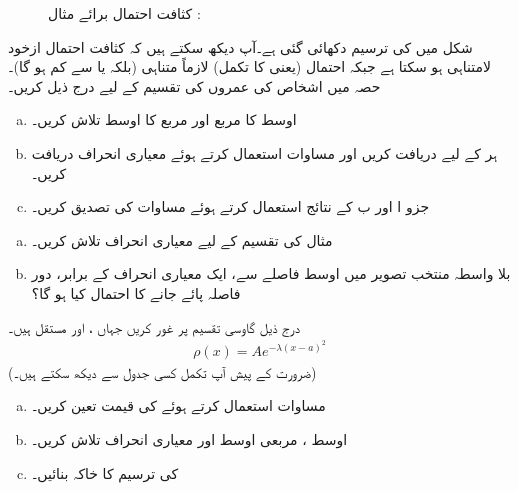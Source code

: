 \begin{figure}
\centering
{}
\caption{کثافت احتمال برائے مثال : }
\label{شکل_تفاعل_موج_کثافت_احتمال_برائے_مثال}
\end{figure}


 شکل    میں    کی ترسیم دکھائی گئی ہے۔آپ دیکھ سکتے ہیں کہ کثافت احتمال ازخود لامتناہی ہو سکتا ہے جبکہ  احتمال (یعنی  کا تکمل) لازماً  متناہی (بلکہ   یا  سے کم ہو گا)۔
 حصہ  میں اشخاص کی عمروں کی تقسیم کے لیے درج ذیل کریں۔ 
\begin{enumerate}[a.]
\item
اوسط کا مربع  اور مربع کا اوسط  تلاش کریں۔ 
\item
 ہر   کے لیے  دریافت کریں اور مساوات  استعمال کرتے ہوئے  معیاری انحراف دریافت کریں۔
\item
 جزو ا اور ب کے نتائج استعمال کرتے ہوئے مساوات   کی تصدیق کریں۔ 
\end{enumerate}
\begin{enumerate}[a.]
\item
 مثال  کی تقسیم کے لیے معیاری انحراف تلاش کریں۔
\item
بلا واسطہ منتخب تصویر میں  اوسط فاصلے سے، ایک معیاری انحراف کے برابر، دور فاصلہ  پائے جانے کا احتمال کیا ہو گا؟
\end{enumerate}
درج ذیل گاوسی تقسیم پر غور کریں  جہاں    ،  اور  مستقل ہیں۔  
\begin{align*}
\rho(x)=Ae^{-\lambda(x-a)^2}
\end{align*}
   (ضرورت کے پیش آپ تکمل کسی جدول سے دیکھ سکتے ہیں۔)
\begin{enumerate}[a.]
\item
مساوات استعمال کرتے ہوئے   کی قیمت تعین کریں۔
\item
اوسط ، مربعی اوسط  اور معیاری انحراف  تلاش کریں۔
\item
{} کی ترسیم کا خاکہ بنائیں۔
\end{enumerate}

